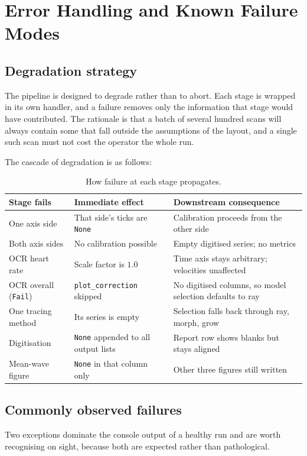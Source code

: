 \documentclass[11pt,a4paper]{article}
\newcommand{\fn}[1]{\ifmmode\text{\ttfamily #1}\else\texttt{#1}\fi}
\begin{document}
\newpage
\section{Error Handling and Known Failure Modes}
\label{sec:failures}
  \subsection{Degradation strategy}
    The pipeline is designed to degrade rather than to abort. Each stage is
    wrapped in its own handler, and a failure removes only the information that
    stage would have contributed. The rationale is that a batch of several hundred
    scans will always contain some that fall outside the assumptions of the
    layout, and a single such scan must not cost the operator the whole run.

    The cascade of degradation is as follows:

    \begin{table}[h]
    \centering
    \small
    \begin{tabular}{@{}p{}p{}p{}@{}}
    \toprule
    Stage fails & Immediate effect & Downstream consequence \\
    \midrule
    One axis side & That side's ticks are \fn{None} &
      Calibration proceeds from the other side \\
    Both axis sides & No calibration possible &
      Empty digitised series; no metrics \\
    OCR heart rate & Scale factor is $1.0$ &
      Time axis stays arbitrary; velocities unaffected \\
    OCR overall (\fn{Fail}) & \fn{plot\_correction} skipped &
      No digitised columns, so model selection defaults to ray \\
    One tracing method & Its series is empty &
      Selection falls back through ray, morph, grow \\
    Digitisation & \fn{None} appended to all output lists &
      Report row shows blanks but stays aligned \\
    Mean-wave figure & \fn{None} in that column only &
      Other three figures still written \\
    \bottomrule
    \end{tabular}
    \caption{How failure at each stage propagates.}
    \end{table}

  \subsection{Commonly observed failures}
    Two exceptions dominate the console output of a healthy run and are worth
    recognising on sight, because both are expected rather than pathological.
\end{document}
